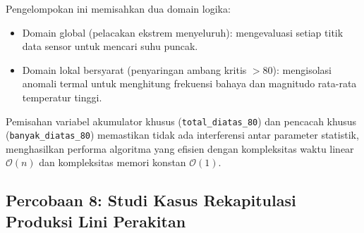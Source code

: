 \documentclass[12pt,a4paper]{article}
\begin{document}
Pengelompokan ini memisahkan dua domain logika:
\begin{itemize}
    \item Domain global (pelacakan ekstrem menyeluruh): mengevaluasi setiap titik data sensor untuk mencari suhu puncak.
    \item Domain lokal bersyarat (penyaringan ambang kritis $> 80$): mengisolasi anomali termal untuk menghitung frekuensi bahaya dan magnitudo rata-rata temperatur tinggi.
\end{itemize}
Pemisahan variabel akumulator khusus (\texttt{total\_diatas\_80}) dan pencacah khusus (\texttt{banyak\_diatas\_80}) memastikan tidak ada interferensi antar parameter statistik, menghasilkan performa algoritma yang efisien dengan kompleksitas waktu linear $\mathcal{O}(n)$ dan kompleksitas memori konstan $\mathcal{O}(1)$.

\subsection{Percobaan 8: Studi Kasus Rekapitulasi Produksi Lini Perakitan}
\end{document}
